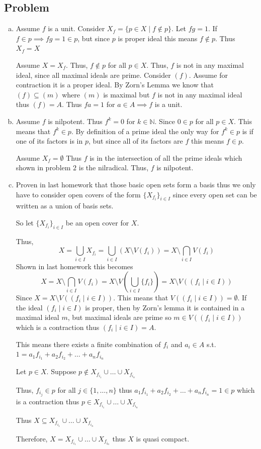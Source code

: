\documentclass[12pt, letterpaper]{article}
\newcounter{problem}
\newcommand{\q}{
    \newpage %
    \stepcounter{problem} %
    \subsection*{Problem \arabic{problem}} %
}
\newcommand{\N}{\mathbb{N}}
\begin{document}
\q
\begin{enumerate}[(a)]\addtocounter{enumi}{1}
    \item Assume $f$ is a unit. Consider $X_f=\{p \in X \mid f \notin p\}$. Let $fg=1$. If $f \in p \implies fg=1 \in p$, but since $p$ is proper ideal this means $f \notin p$. Thus $X_f=X$
    
    Assume $X=X_f$. Thus, $f \notin p$ for all $p \in X$. Thus, $f$ is not in any maximal ideal, since all maximal ideals are prime. Consider $(f)$. Assume for contraction it is a proper ideal. By Zorn's Lemma we know that $(f) \subseteq (m)$ where $(m)$ is maximal but $f$ is not in any maximal ideal thus $(f)=A$. Thus $fa=1$ for $a \in A \implies f$ is a unit.

    \item Assume $f$ is nilpotent. Thus $f^k=0$ for $k \in \N$. Since $0 \in p$ for all $p \in X$. This means that $f^k \in p$. By definition of a prime ideal the only way for $f^k \in p$ is if one of its factors is in $p$, but since all of its factors are $f$ this means $f \in p$.
    
    Assume $X_f=\emptyset$ Thus $f$ is in the intersection of all the prime ideals which shown in problem $2$ is the nilradical. Thus, $f$ is nilpotent.

    \addtocounter{enumi}{1}\item Proven in last homework that those basic open sets form a basis thus we only have to consider open covers of the form $\{X_{f_i}\}_{i \in I}$ since every open set can be written as a union of basis sets.

    So let $\{X_{f_i}\}_{i \in I}$ be an open cover for $X$.

    Thus,
    \[X=\bigcup_{i \in I}X_{f_i}=\bigcup_{i \in I}(X \setminus V(f_i))=X \setminus \bigcap_{i \in I}V(f_i)\]
    Shown in last homework this becomes
    \[X=X \setminus \bigcap_{i \in I}V(f_i)=X \setminus V(\bigcup_{i \in I} \{f_i\})=X \setminus V((f_i \mid i \in I))\]
    Since $X=X \setminus V((f_i \mid i \in I))$. This means that $V((f_i \mid i \in I))=\emptyset$. If the ideal $(f_i \mid i \in I)$ is proper, then by Zorn's lemma it is contained in a maximal ideal $m$, but maximal ideals are prime so $m \in V((f_i \mid i \in I))$ which is a contraction thus $(f_i \mid i \in I)=A$.

    This means there exists a finite combination of $f_i$ and $a_i \in A$ s.t. $1=a_1f_{i_1}+a_2f_{i_2}+\dots+a_nf_{i_n}$

    Let $p \in X$. Suppose $p \notin X_{f_{i_1}} \cup \dots \cup X_{f_{i_n}}$

    Thus, $f_{i_j} \in p$ for all $j \in \{1,\dots,n\}$ thus $a_1f_{i_1}+a_2f_{i_2}+\dots+a_nf_{i_n}=1 \in p$ which is a contraction thus $p \in X_{f_{i_1}} \cup \dots \cup X_{f_{i_n}}$

    Thus $X \subseteq X_{f_{i_1}} \cup \dots \cup X_{f_{i_n}}$

    Therefore, $X=X_{f_{i_1}} \cup \dots \cup X_{f_{i_n}}$ thus $X$ is quasi compact.
\end{enumerate}
\end{document}
